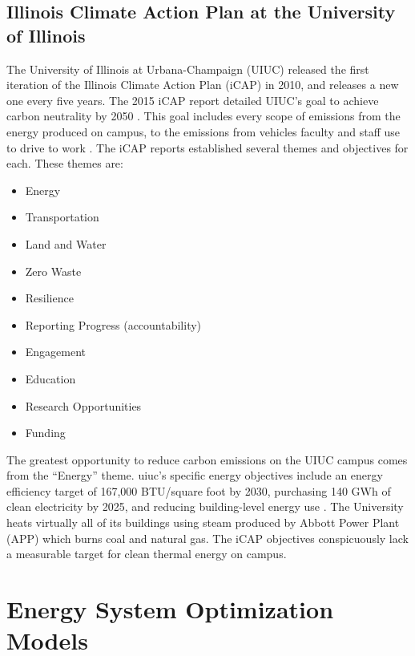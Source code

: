 \subsection{Illinois Climate Action Plan at the University of Illinois}

The University of Illinois at Urbana-Champaign (UIUC) released the first iteration
of the Illinois Climate Action Plan (iCAP) in 2010, and releases a new one every five years.
The 2015 iCAP report detailed UIUC’s goal to achieve carbon neutrality by 2050
\cite{institute_for_sustainability_energy_and_environment_illinois_2015}.
This goal includes every scope of emissions from the energy produced on campus, to
the emissions from vehicles faculty and staff use to drive to work
\cite{institute_for_sustainability_energy_and_environment_illinois_2015,
institute_for_sustainability_energy_and_environment_illinois_2020}. The
iCAP reports established several themes and objectives for each. These themes are:
\begin{itemize}
  \item Energy
  \item Transportation
  \item Land and Water
  \item Zero Waste
  \item Resilience
  \item Reporting Progress (accountability)
  \item Engagement
  \item Education
  \item Research Opportunities
  \item Funding
\end{itemize}
The greatest opportunity to reduce carbon emissions on the UIUC campus comes from
the ``Energy” theme. \gls{uiuc}’s specific energy objectives include an energy
efficiency target of 167,000 BTU/square foot by 2030, purchasing 140 GWh of clean
electricity by 2025, and reducing building-level energy use
\cite{institute_for_sustainability_energy_and_environment_illinois_2020}. The University
heats virtually all of its buildings using steam produced by Abbott Power Plant
(APP) which burns coal and natural gas. The iCAP objectives conspicuously lack a
measurable target for clean thermal energy on campus.

\section{Energy System Optimization Models}


